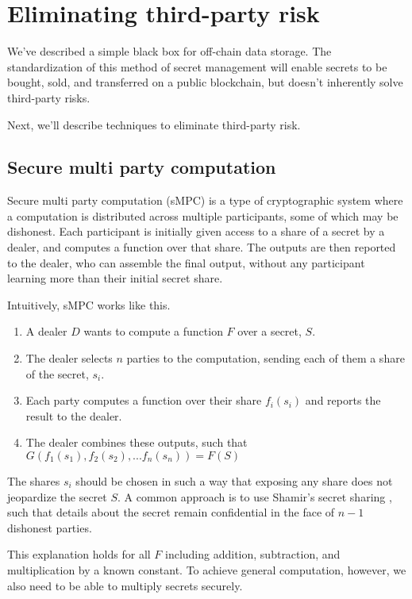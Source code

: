 \documentclass[11pt]{article}
\begin{document}
\section{Eliminating third-party risk} \label{eliminatingRisk}

We've described a simple black box for off-chain data storage. The
standardization of this method of secret management will enable
secrets to be bought, sold, and transferred on a public blockchain,
but doesn't inherently solve third-party risks.

Next, we'll describe techniques to eliminate third-party risk.

\subsection{Secure multi party computation} \label{sMPC}

Secure multi party computation (sMPC) is a type of cryptographic
system where a computation is distributed across multiple
participants, some of which may be dishonest. Each participant is
initially given access to a share of a secret by a dealer, and
computes a function over that share. The outputs are then reported to
the dealer, who can assemble the final output, without any participant
learning more than their initial secret share.

Intuitively, sMPC works like this.

\begin{enumerate}
  \item A dealer $D$ wants to compute a function $F$ over a secret,
      $S$.
  \item The dealer selects $n$ parties to the computation, sending
      each of them a share of the secret, $s_i$.
  \item Each party computes a function over their share $f_i(s_i)$ and
      reports the result to the dealer.
  \item The dealer combines these outputs, such that
      $G(f_1(s_1),f_2(s_2),...f_n(s_n)) = F(S)$
\end{enumerate}

The shares $s_i$ should be chosen in such a way that exposing any
share does not jeopardize the secret $S$. A common approach is to use
Shamir's secret sharing \cite{shamir}, such that details about the
secret remain confidential in the face of $n-1$ dishonest parties.

This explanation holds for all $F$ including addition, subtraction,
and multiplication by a known constant. To achieve general
computation, however, we also need to be able to multiply secrets
securely.
\end{document}
